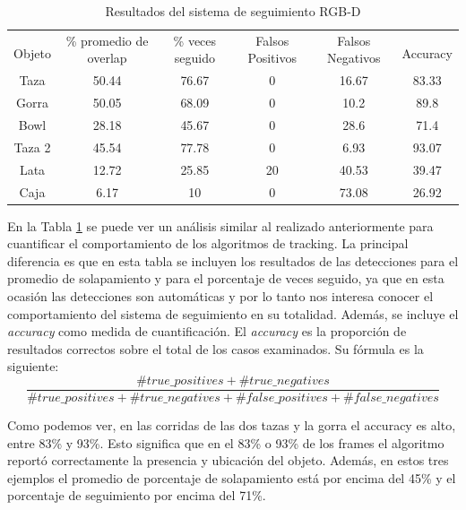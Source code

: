 \begin{table}[h]
	\centering
    \begin{tabular}{|c|c|c|c|c|c|}
    \hline
    & \multirow{2}{2.4cm}{\% promedio de overlap} & \multirow{2}{2cm}{\% veces seguido} & \multirow{2}{1.6cm}{Falsos Positivos} & \multirow{2}{1.6cm}{Falsos Negativos} &\\
	Objeto & & & & & Accuracy\\
	\hline
    Taza    & 50.44      & 76.67     &    0           & 16.67    & 83.33 \\
    \hline
    Gorra   & 50.05      & 68.09     &    0           &  10.2    & 89.8 \\
    \hline
    Bowl    & 28.18      & 45.67     &    0           &  28.6    & 71.4 \\
    \hline
    Taza 2  & 45.54      & 77.78     &    0           &  6.93    & 93.07 \\
    \hline
    Lata    & 12.72      & 25.85     &   20           & 40.53    & 39.47 \\
    \hline
    Caja    &  6.17      &    10     &    0           & 73.08    & 26.92 \\
    \hline
    \end{tabular}
\caption{Resultados del sistema de seguimiento RGB-D}
\label{tabla_sistema_rgbd}
\end{table}

En la Tabla \ref{tabla_sistema_rgbd} se puede ver un análisis similar al realizado anteriormente para cuantificar el comportamiento de los algoritmos de tracking. La principal diferencia es que en esta tabla se incluyen los resultados de las detecciones para el promedio de solapamiento y para el porcentaje de veces seguido, ya que en esta ocasión las detecciones son automáticas y por lo tanto nos interesa conocer el comportamiento del sistema de seguimiento en su totalidad. Además, se incluye el \textit{accuracy} como medida de cuantificación. El \textit{accuracy} es la proporción de resultados correctos sobre el total de los casos examinados. Su fórmula es la siguiente:
\begin{equation}
\frac{\#true\_positives + \#true\_negatives}{\#true\_positives + \#true\_negatives + \#false\_positives + \#false\_negatives}
\end{equation}

Como podemos ver, en las corridas de las dos tazas y la gorra el accuracy es alto, entre 83\% y 93\%. Esto significa que en el 83\% o 93\% de los frames el algoritmo reportó correctamente la presencia y ubicación del objeto. Además, en estos tres ejemplos el promedio de porcentaje de solapamiento está por encima del 45\% y el porcentaje de seguimiento por encima del 71\%.

